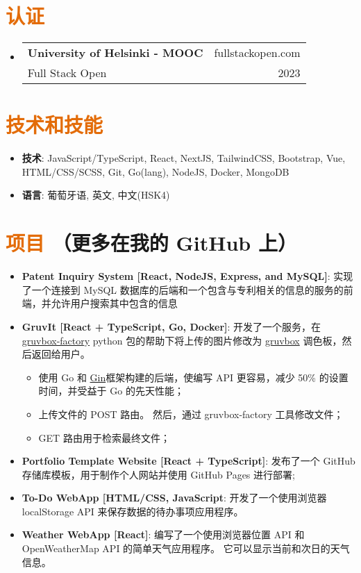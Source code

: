 \documentclass[a4paper, 20pt]{article}
\makeatletter
\newcommand{\resumeItem}[2]{
  \item\small{
    \textbf{#1}{: #2 \vspace{-2pt}}
  }
}
\newcommand{\resumeSubheading}[4]{
  \vspace{-1pt}\item
    \begin{tabular*}{0.97\textwidth}{l@{\extracolsep{\fill}}r}
      \textbf{#1} & #2 \\
      #3 & #4 \\
    \end{tabular*}\vspace{-5pt}
}
\newcommand{\resumeSubItem}[2]{\resumeItem{#1}{#2}\vspace{-3pt}}
\newcommand{\resumeSubHeadingListStart}{\begin{itemize}[leftmargin=*]}
\newcommand{\resumeSubHeadingListEnd}{\end{itemize}}
\makeatother
\begin{document}
\begin{CJK*}{UTF8}{gbsn}
\vspace{5pt}
\section{\textcolor[HTML]{E36C09}{\textbf{认证}}}
\resumeSubHeadingListStart{}
\resumeSubheading{University of Helsinki - MOOC}{fullstackopen.com}
{Full Stack Open}{2023}
\resumeSubHeadingListEnd{}

\vspace{5pt}
\section{\textcolor[HTML]{E36C09}{\textbf{技术和技能}}}
	\resumeSubHeadingListStart
	  \resumeSubItem{技术}{\quad JavaScript/TypeScript, React, NextJS, TailwindCSS, Bootstrap, Vue, HTML/CSS/SCSS, Git, Go(lang), NodeJS, Docker, MongoDB}
	  \resumeSubItem{语言}{\quad 葡萄牙语, 英文, 中文(HSK4)}
  \resumeSubHeadingListEnd


\vspace{5pt}
\section{\textcolor[HTML]{E36C09}{\textbf{项目}} \tiny{（更多在我的 GitHub 上）}}
  \resumeSubHeadingListStart
    \resumeSubItem{Patent Inquiry System [React, NodeJS, Express, and MySQL]}
      {实现了一个连接到 MySQL 数据库的后端和一个包含与专利相关的信息的服务的前端，并允许用户搜索其中包含的信息}
      \vspace{2pt}
      \resumeSubItem{GruvIt [React + TypeScript, Go, Docker]}
      {开发了一个服务，在 \href{https://github.com/paulopacitti/gruvbox-factory}{gruvbox-factory} python 包的帮助下将上传的图片修改为 \href{https://github.com/morhetz/gruvbox}{gruvbox} 调色板，然后返回给用户。}
      \begin{itemize}
        \item{使用 Go 和 \href{https://github.com/gin-gonic/gin}{Gin}框架构建的后端，使编写 API 更容易，减少 50\% 的设置时间，并受益于 Go 的先天性能；}
        \item{上传文件的 POST 路由。 然后，通过 gruvbox-factory 工具修改文件；}
        \item{GET 路由用于检索最终文件；}
      \end{itemize}
      \vspace{2pt}
    \resumeSubItem{Portfolio Template Website [React + TypeScript]}
      {发布了一个 GitHub 存储库模板，用于制作个人网站并使用 GitHub Pages 进行部署;}
      \vspace{2pt}
    \resumeSubItem{To-Do WebApp [HTML/CSS, JavaScript}
      {开发了一个使用浏览器 localStorage API 来保存数据的待办事项应用程序。}
      \vspace{2pt}
    \resumeSubItem{Weather WebApp [React]}
      {编写了一个使用浏览器位置 API 和 OpenWeatherMap API 的简单天气应用程序。 它可以显示当前和次日的天气信息。}
      \vspace{2pt}
  \resumeSubHeadingListEnd

\clearpage\end{CJK*}
\end{document}
